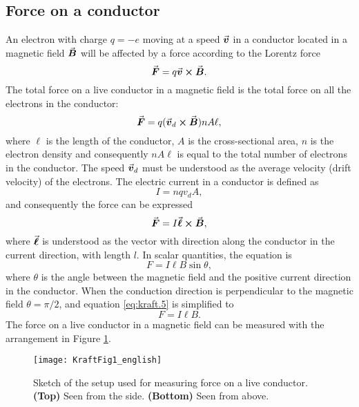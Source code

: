 \documentclass[../Elmag-labhefte-2020.tex]{subfiles}
\begin{document}
\subsection{Force on a conductor \label{ch.kraft.beregn1}}
An electron with charge $q = -e$ moving at a speed $\va*{v}$ in a conductor located in a magnetic field $\va*{B}$ will be affected by a force according to the Lorentz force
\begin{equation}
    \va*{F} = q \va*{v} \cross \va*{B}.
\end{equation}
%
 The total force on a live conductor in a magnetic field is the total force on all the electrons in the conductor:
\begin{equation}
    \va*{F} = q (\va*{v}_d \cross \va*{B} ) n A \ell,
\end{equation}
%
where $\ell$ is the length of the conductor, $A$ is the cross-sectional area, $n$ is the electron density and consequently $n A \ell$ is equal to the total number of electrons in the conductor. The speed $\va*{v}_d$ must be understood as the average velocity (drift velocity) of the electrons.
The electric current in a conductor is defined as
\begin{equation}
    I = nqv_d A ,
\end{equation}
and consequently the force can be expressed
\begin{equation}
    \va*{F} = I\va*{\ell} \cross \va*{B},
\end{equation}
%
where $\va*{\ell}$ is understood as the vector with direction along the conductor in the current direction, with length \(l\). In scalar quantities, the equation is
\begin{equation}
    F = I\ell B \sin \theta,
    \label{eq:kraft.5}
\end{equation}
where $\theta$ is the angle between the magnetic field and the positive current direction in the conductor.
When the conduction direction is perpendicular to the magnetic field $\theta = \pi/2$, and equation \eqref{eq:kraft.5} is simplified to
\begin{equation}
    F = I\ell B.
    \label{eq:kraft.6}
\end{equation}
%
The force on a live conductor in a magnetic field can be measured with the arrangement in Figure \ref{kraft.fig1}.
\begin{figure}[htb]
    \centering
    \texttt{[image: KraftFig1\_english]}
    \caption{%
        Sketch of the setup used for measuring force on a live conductor.
        \textbf{(Top)} Seen from the side.
        \textbf{(Bottom)} Seen from above.
    }
    \label{kraft.fig1}
\end{figure}
\end{document}
